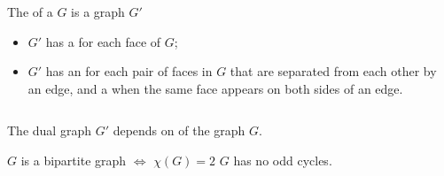 
\begin{frame}{}
\end{frame}

\begin{frame}{}
\end{frame}

\begin{frame}{}
  \begin{definition}
    The  of a  $G$
    is a graph $G'$
    \begin{itemize}
      \item $G'$ has a  for each face of $G$;
      \item $G'$ has an  for each pair of faces in $G$
        that are separated from each other by an edge,
	and a  when the same face appears on both sides of an edge.
    \end{itemize}
  \end{definition}

\end{frame}

\begin{frame}{}
  \begin{columns}
      \pause
  \end{columns}
\end{frame}

\begin{frame}{}
  \begin{center}
    The dual graph $G'$ depends on  of the graph $G$.
  \end{center}

\end{frame}

\begin{frame}{}
  \begin{theorem}
    $G$ is a bipartite graph $\iff$ $\chi(G) = 2$ \red{$\iff$} $G$ has no odd cycles.
  \end{theorem}
\end{frame}

